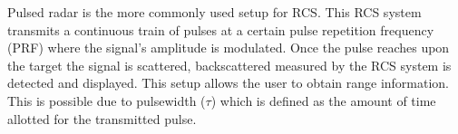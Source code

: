 Pulsed radar is the more commonly used setup for RCS. This RCS system transmits a continuous train of pulses at a certain pulse repetition frequency (PRF) where the signal's amplitude is modulated. Once the pulse reaches upon the target the signal is scattered, backscattered measured by the RCS system  is detected and displayed. This setup allows the user to obtain range information. This is possible due to pulsewidth ($\tau$) which is defined as the amount of time allotted for the transmitted pulse.     
